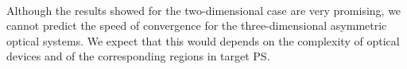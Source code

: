 \\ \indent 
Although the results showed for the two-dimensional case are very promising, we cannot predict the speed of convergence for the three-dimensional asymmetric optical systems. We expect that this would depends on the complexity of optical devices and of the corresponding regions in target PS. 

